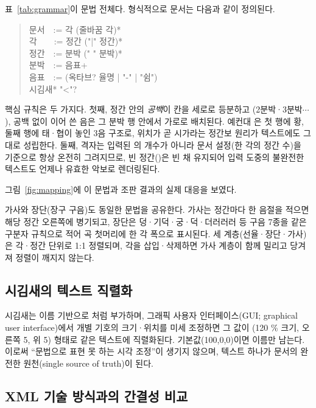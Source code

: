 표~\ref{tab:grammar}이 문법 전체다. 형식적으로 문서는 다음과 같이 정의된다.

\begin{quote}\footnotesize\ttfamily
문서\ \ := 각 (줄바꿈 각)* \\
각\ \ \ \ := 정간 ("|" 정간)* \\
정간\ \ := 분박 (" " 분박)* \\
분박\ \ := 음표+ \\
음표\ \ := (옥타브? 율명 | "-" | "쉼")\\
\hspace*{3.4em}시김새* "<"?
\end{quote}

핵심 규칙은 두 가지다. 첫째, 정간 안의 \emph{공백}이 칸을 세로로 등분하고
(2분박·3분박$\cdots$), 공백 없이 이어 쓴 음은 그 분박 행 안에서 가로로
배치된다. 예컨대 은 첫 행에 황, 둘째 행에 태·협이 놓인
3음 구조로, 위치가 곧 시가라는 정간보 원리가 텍스트에도 그대로 성립한다.
둘째, 격자는 입력된 \code{|}의 개수가 아니라 문서 설정(한 각의 정간 수)을
기준으로 항상 온전히 그려지므로, 빈 정간(\code{ | })은 빈 채 유지되어
입력 도중의 불완전한 텍스트도 언제나 유효한 악보로 렌더링된다.

그림~\ref{fig:mapping}에 이 문법과 조판 결과의 실제 대응을 보였다.

가사와 장단(장구 구음)도 동일한 문법을 공유한다. 가사는 정간마다 한 음절을
적으면 해당 정간 오른쪽에 병기되고, 장단은 덩·기덕·궁·덕·더러러러 등
구음 7종을 같은 구분자 규칙으로 적어 곡 첫머리에 한 각 폭으로 표시된다.
세 계층(선율·장단·가사)은 각·정간 단위로 1:1 정렬되며, 각을 삽입·삭제하면
가사 계층이 함께 밀리고 당겨져 정렬이 깨지지 않는다.

\subsection{시김새의 텍스트 직렬화}

시김새는 이름 기반으로 처럼 부가하며, 그래픽 사용자
인터페이스(GUI; graphical user interface)에서 개별 기호의
크기·위치를 미세 조정하면 그 값이 (120 \% 크기,
오른쪽 5, 위 5) 형태로 같은 텍스트에 직렬화된다. 기본값(100,0,0)이면 이름만
남는다. 이로써 ``문법으로 표현 못 하는 시각 조정''이 생기지 않으며,
텍스트 하나가 문서의 완전한 원천(single source of truth)이 된다.

\subsection{XML 기술 방식과의 간결성 비교}

